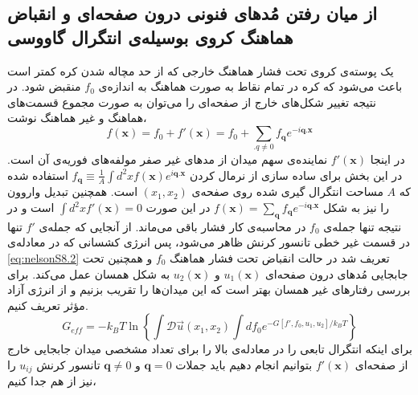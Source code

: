 \subsection{
از میان رفتن مُدهای فنونی درون صفحه‌ای و انقباض هماهنگ کروی بوسیله‌ی انتگرال گاووسی
}
یک پوسته‌ی کروی تحت فشار هماهنگ خارجی که از حد مچاله شدن کره
کمتر است باعث می‌شود که کره در تمام نقاط به صورت هماهنگ به اندازه‌ی $f_0$ منقبض شود. در نتیجه‌ تغییر شکل‌های خارج از صفحه‌ای را می‌توان به صورت مجموع قسمت‌های هماهنگ و غیر هماهنگ نوشت،
\begin{equation}
f(\boldsymbol x)=f_0+f'(\boldsymbol x) = f_0+\sum_{\boldsymbol . q\neq0}f_{\boldsymbol q}e^{-i\boldsymbol q.\boldsymbol x}
\label{eq:nelsonS10}
\end{equation}
در اینجا $f'(\boldsymbol x)$ 
نماینده‌ی سهم میدان از مد‌های غیر صفر مولفه‌های فوریه‌ی آن است. در این بخش برای ساده سازی از نرمال کردن 
$f_{\boldsymbol q} \equiv \frac{1}{A}\int d^2xf(\boldsymbol x) e^{i\boldsymbol q.\boldsymbol x}$
استفاده شده که $A$ مساحت انتگرال گیری شده روی صفحه‌ی $(x_1,x_2)$ است. همچنین تبدیل واروون را نیز به شکل 
$f(\boldsymbol x) = \sum_{\boldsymbol q}f_{\boldsymbol q}e^{-i\boldsymbol q.\boldsymbol x}$
در این صورت 
$\int d^2xf'(\boldsymbol x)=0$
است و در نتیجه تنها جمله‌‌ی $f_0$ در محاسبه‌ی کار فشار باقی می‌ماند. از آنجایی که جمله‌ی $f'$ تنها در قسمت غیر خطی تانسور کرنش ظاهر می‌شود، پس انرژی کشسانی که در معادله‌ی \ref{eq:nelsonS8.2} تعریف شد در حالت انقباض تحت فشار هماهنگ $f_0$ و همچنین تحت جابجایی مُدهای درون صفحه‌ای $u_1(\boldsymbol x)$ و $u_2(\boldsymbol x)$ به شکل همسان
 عمل می‌کند. برای بررسی رفتارهای غیر همسان بهتر است که این میدان‌ها را تقریب بزنیم و از انرژی آزاد مؤثر تعریف کنیم.
 \begin{equation}
G_{eff}=-k_BT\ln\left\{\int\mathcal D\vec u(x_1,x_2)\int df_0e^{-G[f',f_0,u_1,u_2]/k_BT}\right\}
\label{eq:nelsonS11}
\end{equation}
برای اینکه انتگرال تابعی را در معادله‌ی بالا را برای تعداد مشخصی میدان جابجایی خارج از صفحه‌ای $f'(\boldsymbol x)$ بتوانیم انجام دهیم باید جملات $\boldsymbol q = 0$ و $\boldsymbol q \neq 0$ تانسور کرنش $u_{ij}$ 
را نیز از هم جدا کنیم،

